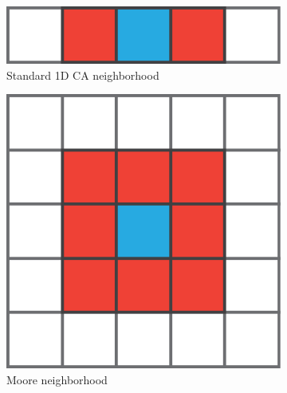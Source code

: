\begin{figure}[htbp]
  \centering
  \begin{subfigure}[c]{.3\linewidth}
    \centering
    \includegraphics[width=\linewidth]{figures/1d_neigh}
    \caption{Standard 1D \ac{CA} neighborhood}
    \label{fig:1d_neigh}
  \end{subfigure}
  \begin{subfigure}[c]{.3\linewidth}
    \centering
    \includegraphics[width=\linewidth]{figures/moore}
    \caption{Moore neighborhood}
    \label{fig:moore}
  \end{subfigure}
  \begin{subfigure}[c]{.3\linewidth}
    \centering

\end{subfigure}
\end{figure}
